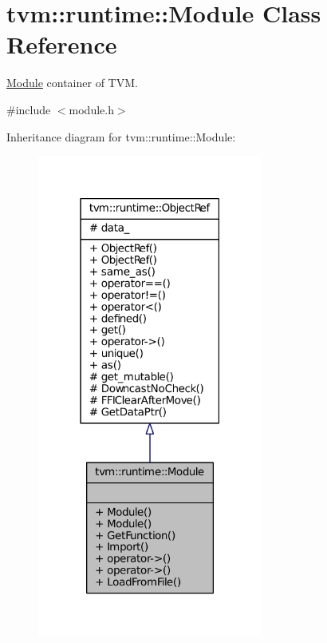 \hypertarget{classtvm_1_1runtime_1_1Module}{}\section{tvm\+:\+:runtime\+:\+:Module Class Reference}
\label{classtvm_1_1runtime_1_1Module}


\hyperlink{classtvm_1_1runtime_1_1Module}{Module} container of T\+VM.  




{\ttfamily \#include $<$module.\+h$>$}



Inheritance diagram for tvm\+:\+:runtime\+:\+:Module\+:
\nopagebreak
\begin{figure}[H]
\begin{center}
\leavevmode
\includegraphics[width=210pt]{classtvm_1_1runtime_1_1Module__inherit__graph}
\end{center}
\end{figure}



